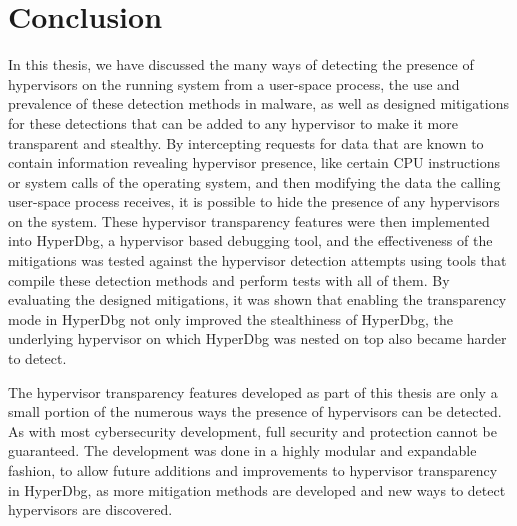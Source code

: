 \section{Conclusion}\label{s:conclusion}

In this thesis, we have discussed the many ways of detecting the presence of hypervisors on the running system from a user-space process, 
the use and prevalence of these detection methods in malware, as well as designed mitigations for these detections that can be added to any hypervisor to make it more transparent and stealthy. 
By intercepting requests for data that are known to contain information revealing hypervisor presence, like certain CPU instructions or system calls of the operating system, 
and then modifying the data the calling user-space process receives, it is possible to hide the presence of any hypervisors on the system. 
These hypervisor transparency features were then implemented into HyperDbg, a hypervisor based debugging tool, and the effectiveness of the mitigations was 
tested against the hypervisor detection attempts using tools that compile these detection methods and perform tests with all of them. By evaluating the designed mitigations, 
it was shown that enabling the transparency mode in HyperDbg not only improved the stealthiness of HyperDbg, the underlying hypervisor on which HyperDbg was nested on top also 
became harder to detect.

The hypervisor transparency features developed as part of this thesis are only a small portion of the numerous ways the presence of hypervisors can be detected. 
As with most cybersecurity development, full security and protection cannot be guaranteed. The development was done in a highly modular and expandable fashion, 
to allow future additions and improvements to hypervisor transparency in HyperDbg, as more mitigation methods are developed and new ways to detect hypervisors are discovered. 



